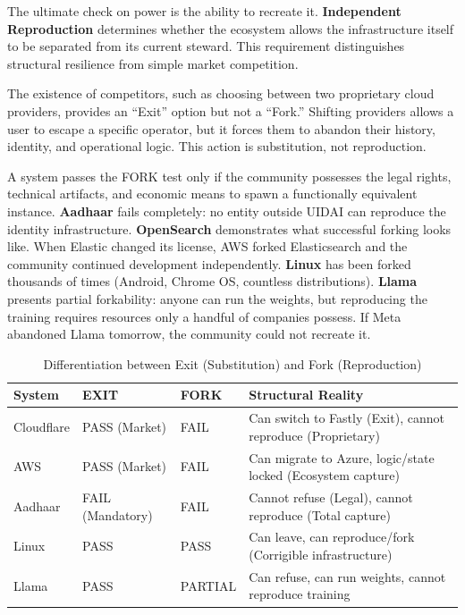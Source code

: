 \documentclass{article}
\begin{document}
The ultimate check on power is the ability to recreate it. \textbf{Independent Reproduction} determines whether the ecosystem allows the infrastructure itself to be separated from its current steward. This requirement distinguishes structural resilience from simple market competition.

The existence of competitors, such as choosing between two proprietary cloud providers, provides an ``Exit'' option but not a ``Fork.'' Shifting providers allows a user to escape a specific operator, but it forces them to abandon their history, identity, and operational logic. This action is substitution, not reproduction.

A system passes the FORK test only if the community possesses the legal rights, technical artifacts, and economic means to spawn a functionally equivalent instance. \textbf{Aadhaar} fails completely: no entity outside UIDAI can reproduce the identity infrastructure. \textbf{OpenSearch} demonstrates what successful forking looks like. When Elastic changed its license, AWS forked Elasticsearch and the community continued development independently. \textbf{Linux} has been forked thousands of times (Android, Chrome OS, countless distributions). \textbf{Llama} presents partial forkability: anyone can run the weights, but reproducing the training requires resources only a handful of companies possess. If Meta abandoned Llama tomorrow, the community could not recreate it.

\begin{table}[htbp]
\centering
\begin{tabular}{@{}llll@{}}
\toprule
\textbf{System} & \textbf{EXIT} & \textbf{FORK} & \textbf{Structural Reality} \\
\midrule
Cloudflare & PASS (Market) & FAIL & Can switch to Fastly (Exit), cannot reproduce (Proprietary) \\
AWS & PASS (Market) & FAIL & Can migrate to Azure, logic/state locked (Ecosystem capture) \\
Aadhaar & FAIL (Mandatory) & FAIL & Cannot refuse (Legal), cannot reproduce (Total capture) \\
Linux & PASS & PASS & Can leave, can reproduce/fork (Corrigible infrastructure) \\
Llama & PASS & PARTIAL & Can refuse, can run weights, cannot reproduce training \\
\bottomrule
\end{tabular}
\caption{Differentiation between Exit (Substitution) and Fork (Reproduction)}
\end{table}
\end{document}
